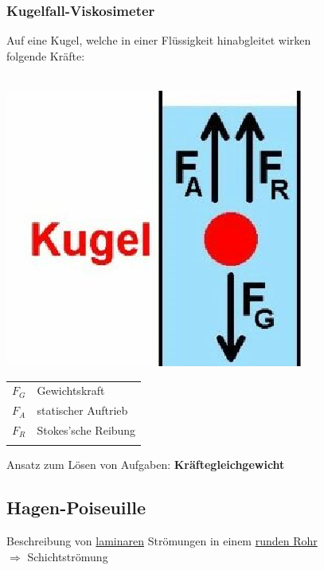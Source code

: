 \subsubsection{Kugelfall-Viskosimeter}
Auf eine Kugel, welche in einer Flüssigkeit hinabgleitet wirken \\
folgende Kräfte: \\
\\
\begin{minipage}{0.4\linewidth}
\includegraphics[width=0.8\linewidth]{Bilder/kugelfall-viskosimeter} \\
\end{minipage}
\hfill
\begin{minipage}{0.53\linewidth}
\begin{tabular}{ll}
$F_G$ & Gewichtskraft \\
$F_A$ & statischer Auftrieb \\
$F_R$ & Stokes'sche Reibung \\
\\
\end{tabular}

Ansatz zum Lösen von Aufgaben: \textbf{Kräftegleichgewicht}
\end{minipage}








\subsection{Hagen-Poiseuille}
Beschreibung von \underline{laminaren} Strömungen in einem \underline{runden Rohr} \\
$\Rightarrow$ Schichtströmung

